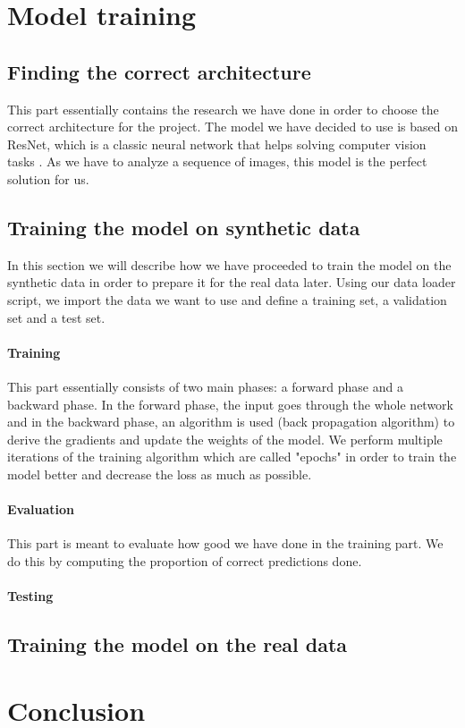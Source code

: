 \documentclass[10pt,conference]{IEEEtran}
\begin{document}
\section{Model training}
\subsection{Finding the correct architecture}
This part essentially contains the research we have done in order to choose the correct architecture for the project. The model we have decided to use is based on ResNet, which is a classic neural network that helps solving computer vision tasks \cite{hara3dcnns}. As we have to analyze a sequence of images, this model is the perfect solution for us.

\subsection{Training the model on synthetic data}
In this section we will describe how we have proceeded to train the model on the synthetic data in order to prepare it for the real data later. Using our data loader script, we import the data we want to use and define a training set, a validation set and a test set.
\paragraph{Training} This part essentially consists of two main phases: a forward phase and a backward phase. In the forward phase, the input goes through the whole network and in the backward phase, an algorithm is used (back propagation algorithm) to derive the gradients and update the weights of the model. We perform multiple iterations of the training algorithm which are called "epochs" in order to train the model better and decrease the loss as much as possible.
\paragraph{Evaluation} This part is meant to evaluate how good we have done in the training part. We do this by computing the proportion of correct predictions done.
\paragraph{Testing} %

\subsection{Training the model on the real data}

\section{Conclusion}



\end{document}
